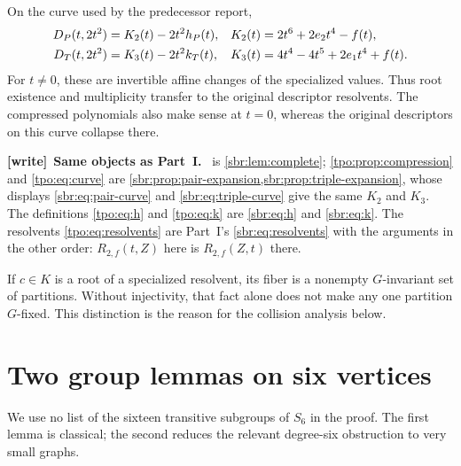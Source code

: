 \documentclass[11pt,letterpaper]{article}
\numberwithin{equation}{section}
\theoremstyle{definition}
\theoremstyle{remark}
\newcommand{\Rtwo}{R_{2,f}}
\newenvironment{writenote}[1][]{\par\smallskip\begingroup\small
 \noindent\textbf{[write]}\if\relax\detokenize{#1}\relax\else~\textbf{#1.}\fi\ }%
 {\par\endgroup\smallskip}
\begin{document}
On the curve used by the predecessor report,
\begin{align}
 D_P(t,2t^2)&=K_2(t)-2t^2h_P(t),&K_2(t)&=2t^6+2e_2t^4-f(t),\notag\\
 D_T(t,2t^2)&=K_3(t)-2t^2k_T(t),&K_3(t)&=4t^4-4t^5+2e_1t^4+f(t).
 \label{tpo:eq:curve}
\end{align}
For $t\ne0$, these are invertible affine changes of the specialized values.
Thus root existence and multiplicity transfer to the original descriptor
resolvents. The compressed polynomials also make sense at $t=0$, whereas the
original descriptors on this curve collapse there.

\begin{writenote}[Same objects as Part~I]
 is \cref{sbr:lem:complete};
\cref{tpo:prop:compression} and \eqref{tpo:eq:curve} are
\cref{sbr:prop:pair-expansion,sbr:prop:triple-expansion}, whose displays
\eqref{sbr:eq:pair-curve} and \eqref{sbr:eq:triple-curve} give the same
$K_2$ and $K_3$. The definitions \eqref{tpo:eq:h} and \eqref{tpo:eq:k} are
\eqref{sbr:eq:h} and \eqref{sbr:eq:k}. The resolvents
\eqref{tpo:eq:resolvents} are Part~I's \eqref{sbr:eq:resolvents} with the
arguments in the other order: $\Rtwo(t,Z)$ here is $\Rtwo(Z,t)$ there.
\end{writenote}

\begin{remark}
If $c\in K$ is a root of a specialized resolvent, its fiber is a nonempty
$G$-invariant set of partitions. Without injectivity, that fact alone does not
make any one partition $G$-fixed. This distinction is the reason for the
collision analysis below.
\end{remark}

\section{Two group lemmas on six vertices}
\label{tpo:sec:groups}

We use no list of the sixteen transitive subgroups of $S_6$ in the proof.
The first lemma is classical; the second reduces the relevant degree-six
obstruction to very small graphs.
\end{document}
